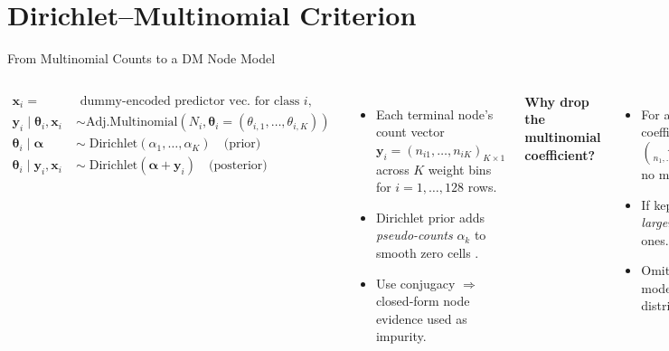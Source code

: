 \documentclass[aspectratio=169,professionalfonts]{beamer}
\begin{document}
\section{Dirichlet–Multinomial Criterion}

\begin{frame}{From Multinomial Counts to a DM Node Model}
\footnotesize         %
\begin{columns}[T]
\begin{align*}  
    \mathbf x_i = &\text{ dummy-encoded predictor vec. for class } i, \\
    \mathbf y_i \;\Big|\; \boldsymbol\theta_i, \mathbf{x}_i
          &\sim \text{Adj.Multinomial}(N_i,\boldsymbol\theta_i = (\theta_{i,1}, \dots, \theta_{i,K}))\\
    \boldsymbol\theta_i \;\Big|\; \boldsymbol{\alpha} \;&\sim\;
    \text{Dirichlet}(\alpha_1, \dots, \alpha_K) \quad \text{(prior)}\\
    \boldsymbol\theta_i \;\Big|\; \mathbf{y}_i, \mathbf{x}_i \;&\sim\;
    \text{Dirichlet}(\boldsymbol\alpha + \mathbf{y}_i) \quad \text{(posterior)}
\end{align*}

\vskip2pt
\begin{itemize}
  \item Each terminal node's count vector $\mathbf y_i=(n_{i1},\dots,n_{iK})_{K \times 1}$ across $K$ weight bins for \(i=1,\dots,128\) rows.
  \item Dirichlet prior adds \emph{pseudo-counts} $\alpha_k$ to smooth zero cells \citep{poole_mackworth2025pseudo}.
  \item Use conjugacy $\Rightarrow$ closed‑form node evidence used as impurity.
\end{itemize}

\textbf{Why drop the multinomial coefficient?}
\begin{itemize}\itemsep1.5pt
  \item For a split $N=N_1 + N_2$, the coefficient $\displaystyle\binom{N}{n_1,\dots,n_K} > \binom{N_1}{\cdot} + \binom{N_2}{\cdot}$ no matter the counts.
  \item If kept, CART would favor \emph{larger} partitions, not purer ones.
  \item Omitting it lets the criterion model solely the distributional fit.
\end{itemize}
\end{columns}
\end{frame}
\end{document}
